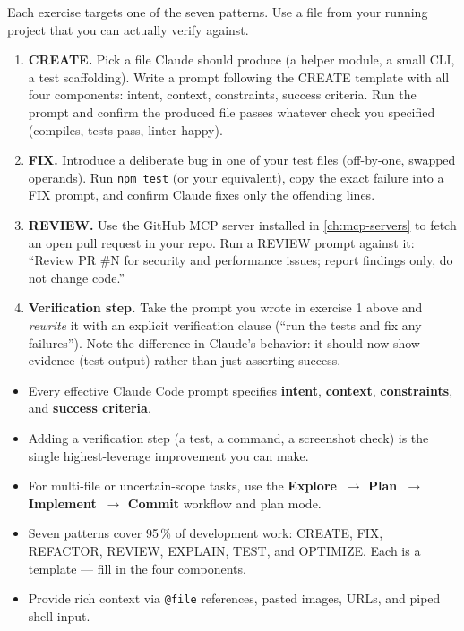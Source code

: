 \begin{exercisebox}
Each exercise targets one of the seven patterns. Use a file from your
running project that you can actually verify against.

\begin{enumerate}
  \item \textbf{CREATE.} Pick a file Claude should produce (a helper
        module, a small CLI, a test scaffolding). Write a prompt
        following the CREATE template with all four components: intent,
        context, constraints, success criteria. Run the prompt and
        confirm the produced file passes whatever check you specified
        (compiles, tests pass, linter happy).
  \item \textbf{FIX.} Introduce a deliberate bug in one of your test
        files (off-by-one, swapped operands). Run \texttt{npm test}
        (or your equivalent), copy the exact failure into a FIX prompt,
        and confirm Claude fixes only the offending lines.
  \item \textbf{REVIEW.} Use the GitHub MCP server installed in
        \cref{ch:mcp-servers} to fetch an open pull request in your
        repo. Run a REVIEW prompt against it: ``Review PR \#N for
        security and performance issues; report findings only, do not
        change code.''
  \item \textbf{Verification step.} Take the prompt you wrote in
        exercise 1 above and \emph{rewrite} it with an explicit
        verification clause (``run the tests and fix any failures'').
        Note the difference in Claude's behavior: it should now show
        evidence (test output) rather than just asserting success.
\end{enumerate}
\end{exercisebox}

\begin{summarybox}
\begin{itemize}
  \item Every effective Claude Code prompt specifies \textbf{intent},
        \textbf{context}, \textbf{constraints}, and \textbf{success criteria}.
  \item Adding a verification step (a test, a command, a screenshot check) is
        the single highest-leverage improvement you can make.
  \item For multi-file or uncertain-scope tasks, use the
        \textbf{Explore~$\to$ Plan~$\to$ Implement~$\to$ Commit} workflow and
        plan mode.
  \item Seven patterns cover 95\,\% of development work: CREATE, FIX,
        REFACTOR, REVIEW, EXPLAIN, TEST, and OPTIMIZE. Each is a template —
        fill in the four components.
  \item Provide rich context via \texttt{@file} references, pasted images,
        URLs, and piped shell input.
\end{itemize}
\end{summarybox}

\nocite{*}
\printbibliography[heading=subbibliography,title={References}]
